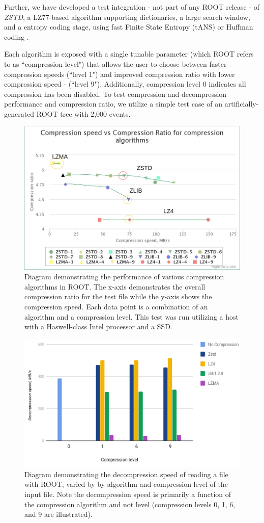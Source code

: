 \documentclass[12pt]{iopart}
\begin{document}
Further, we have developed a test integration - not part of any ROOT release - of \textit{ZSTD}, a LZ77-based algorithm supporting dictionaries, a large search window, and a entropy coding stage, using fast Finite State Entropy (tANS) or Huffman coding \cite{zstd}.

Each algorithm is exposed with a single tunable parameter (which ROOT refers to as ``compression level") that allows the user to choose between faster compression speeds (``level 1") and improved compression ratio with lower compression speed - (``level 9"). Additionally, compression level 0 indicates all compression has been disabled.  To test compression and decompression performance and compression ratio, we utilize a simple test case of an artificially-generated ROOT tree with 2,000 events.

\begin{figure}[h]
\centering
\includegraphics[width=0.8\linewidth]{compr.png}
\caption{Diagram demonstrating the performance of various compression algorithms in ROOT.  The x-axis demonstrates the overall compression ratio for the test file while the y-axis shows the compression speed.  Each data point is a combination of an algorithm and a compression level.  This test was run utilizing a host with a Haswell-class Intel processor and a SSD.}
\label{fig:compression}
\end{figure}

\begin{figure}[h]
\centering
\includegraphics[width=0.9\linewidth]{acat11.png}
\caption{Diagram demonstrating the decompression speed of reading a file with ROOT, varied by by algorithm and compression level of the input file.  Note the decompression speed is primarily a function of the compression algorithm and not level (compression levels 0, 1, 6, and 9 are illustrated).}
\label{fig:decompression}
\end{figure}
\end{document}
